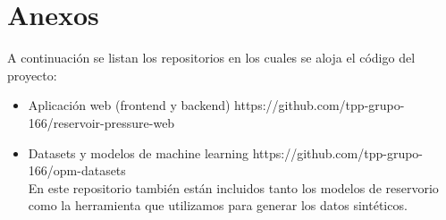 \documentclass[12pt,a4paper]{article}
\begin{document}
\newpage
\section{Anexos}

A continuación se listan los repositorios en los cuales se aloja el código del proyecto:

\begin{itemize}
  \item Aplicación web (frontend y backend) https://github.com/tpp-grupo-166/reservoir-pressure-web
  \item Datasets y modelos de machine learning https://github.com/tpp-grupo-166/opm-datasets \\
  En este repositorio también están incluidos tanto los modelos de reservorio como la herramienta que utilizamos para generar los datos sintéticos.
\end{itemize}


\newpage
\end{document}
